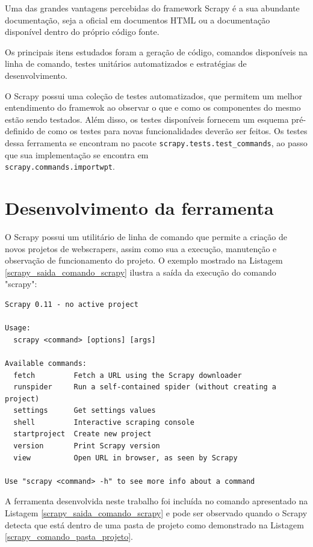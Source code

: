 Uma das grandes vantagens percebidas do framework Scrapy é a sua abundante documentação, seja a oficial em documentos HTML ou a documentação disponível dentro do próprio código fonte.

Os principais itens estudados foram a geração de código, comandos disponíveis na linha de comando, testes unitários automatizados e estratégias de desenvolvimento.

O Scrapy possui uma coleção de testes automatizados, que permitem um melhor entendimento do framewok ao observar o que e como os componentes do mesmo estão sendo testados. Além disso, os testes disponíveis fornecem um esquema pré-definido de como os testes para novas funcionalidades deverão ser feitos. Os testes dessa ferramenta se encontram no pacote \texttt{scrapy.tests.test\_commands}, ao passo que sua implementação se encontra em \\
 \texttt{scrapy.commands.importwpt}.

\section{Desenvolvimento da ferramenta}

O Scrapy possui um utilitário de linha de comando que permite a criação de novos projetos de \glspl{webscraper}, assim como sua a execução, manutenção e observação de funcionamento do projeto. O exemplo mostrado na Listagem \ref{scrapy_saida_comando_scrapy} ilustra a saída da execução do comando "scrapy":

\begin{lstlisting}[label=scrapy_saida_comando_scrapy]
Scrapy 0.11 - no active project

Usage:
  scrapy <command> [options] [args]

Available commands:
  fetch         Fetch a URL using the Scrapy downloader
  runspider     Run a self-contained spider (without creating a project)
  settings      Get settings values
  shell         Interactive scraping console
  startproject  Create new project
  version       Print Scrapy version
  view          Open URL in browser, as seen by Scrapy

Use "scrapy <command> -h" to see more info about a command
\end{lstlisting}

A ferramenta desenvolvida neste trabalho foi incluída no comando apresentado na Listagem \ref{scrapy_saida_comando_scrapy} e pode ser observado quando o Scrapy detecta que está dentro de uma pasta de projeto como demonstrado na Listagem \ref{scrapy_comando_pasta_projeto}.

